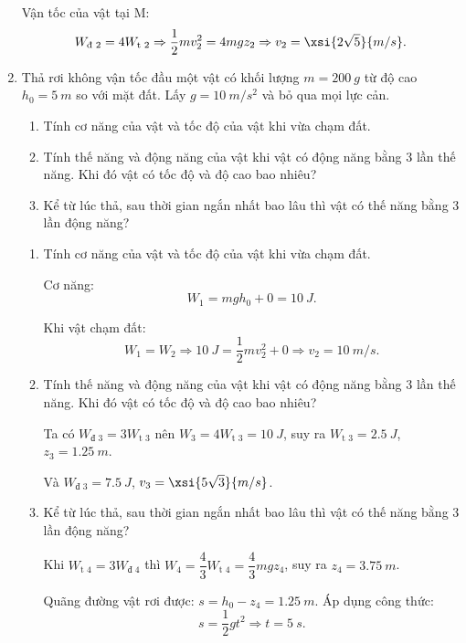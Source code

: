 \begin{enumerate}[label=\bfseries Câu \arabic*:, leftmargin=1.5cm]
{\begin{enumerate}[label=\alph*)]
			Vận tốc của vật tại M:
			$$W_\text{đ 2} = 4 W_\text{t 2} \Rightarrow \dfrac{1}{2}mv_2^2 = 4 mgz_2 \Rightarrow v_2 = \xsi{2\sqrt 5}{m/s}.$$
		\end{enumerate}
	}
	
	\item {}
	
	
	{
		Thả rơi không vận tốc đầu một vật có khối lượng $m=\SI{200}{g}$ từ độ cao $h_0=\SI{5}{m}$ so với mặt đất. Lấy $g=\SI{10}{m/s^2}$ và bỏ qua mọi lực cản.
		\begin{enumerate}[label=\alph*)]
			\item Tính cơ năng của vật và tốc độ của vật khi vừa chạm đất.
			\item Tính thế năng và động năng của vật khi vật có động năng bằng 3 lần thế năng. Khi đó vật có tốc độ và độ cao bao nhiêu?
			\item Kể từ lúc thả, sau thời gian ngắn nhất bao lâu thì vật có thế năng bằng 3 lần động năng?
		\end{enumerate}
	}
	
	\hideall
	{	
		\begin{enumerate}[label=\alph*)]
			\item Tính cơ năng của vật và tốc độ của vật khi vừa chạm đất.
			
			Cơ năng:
			$$W_1 = mgh_0 + 0 = \SI{10}{J}.$$
			
			Khi vật chạm đất:
			$$W_1 = W_2 \Rightarrow \SI{10}{J} = \dfrac{1}{2} mv_2^2 + 0 \Rightarrow v_2 = \SI{10}{m/s}.$$
			
			\item Tính thế năng và động năng của vật khi vật có động năng bằng 3 lần thế năng. Khi đó vật có tốc độ và độ cao bao nhiêu?
			
			Ta có $W_\text{đ 3} = 3 W_\text{t 3}$ nên $W_3 = 4 W_\text{t 3} = \SI{10}{J}$, suy ra $W_\text{t 3} = \SI{2.5}{J}$, $z_3 = \SI{1.25}{m}$.
			
			Và $W_\text{đ 3} = \SI{7.5}{J}$, $v_3 = \xsi{5\sqrt 3}{m/s}$.
			
			\item Kể từ lúc thả, sau thời gian ngắn nhất bao lâu thì vật có thế năng bằng 3 lần động năng?
			
			Khi $W_\text{t 4} = 3W_\text{đ 4}$ thì $W_4 = \dfrac{4}{3} W_\text{t 4} = \dfrac{4}{3} mgz_4$, suy ra $z_4 = \SI{3.75}{m}$.
			
			Quãng đường vật rơi được: $s=h_0-z_4 = \SI{1.25}{m}$. Áp dụng công thức:
			$$s=\dfrac{1}{2}gt^2 \Rightarrow t = \SI{5}{s}.$$
		\end{enumerate}
	}
	

\end{enumerate}
